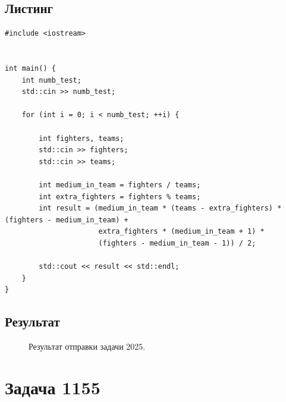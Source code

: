 \documentclass[a5paper, 10pt]{article}
\theoremstyle{definition}
\theoremstyle{plain}
\theoremstyle{remark}
\begin{document}
\subsection{Листинг}

\begin{center}
\begin{lstlisting}[label=some-code,caption={Исходный код для 2025}]
#include <iostream>


int main() {
    int numb_test;
    std::cin >> numb_test;

    for (int i = 0; i < numb_test; ++i) {

        int fighters, teams;
        std::cin >> fighters;
        std::cin >> teams;

        int medium_in_team = fighters / teams;
        int extra_fighters = fighters % teams;
        int result = (medium_in_team * (teams - extra_fighters) * (fighters - medium_in_team) +
                      extra_fighters * (medium_in_team + 1) *
                      (fighters - medium_in_team - 1)) / 2;

        std::cout << result << std::endl;
    }
}

\end{lstlisting}
\end{center}

\subsection{Результат}
\begin{figure}[h]
\caption{Результат отправки задачи 2025.}
\end{figure}

\newpage
\section{Задача 1155}
\end{document}
